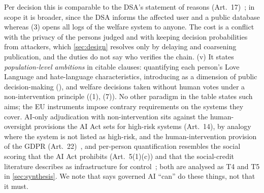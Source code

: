 Per decision this is comparable to the DSA's statement of reasons (Art.~17)~\cite{dsa2022}; in scope it is broader, since the DSA informs the affected user and a public database whereas (3) opens all logs of the welfare system to anyone.
The cost is a conflict with the privacy of the persons judged and with keeping decision probabilities from attackers, which \cref{sec:design} resolves only by delaying and coarsening publication, and the duties do not say who verifies the chain.
(v) It states \emph{population-level ambitions} in citable clauses: quantifying each person's Love Language and hate-language characteristics, introducing \pol{} as a dimension of public decision-making (), and welfare decisions taken without human votes under a non-intervention principle ((1), (7)).
No other paradigm in the table states such aims; the EU instruments impose contrary requirements on the systems they cover.
AI-only adjudication with non-intervention sits against the human-oversight provisions the AI Act sets for high-risk systems (Art.~14), by analogy where the system is not listed as high-risk, and the human-intervention provision of the GDPR (Art.~22)~\cite{euaiact2024,gdpr2016}, and per-person quantification resembles the social scoring that the AI Act prohibits (Art.~5(1)(c)) and that the social-credit literature describes as infrastructure for control~\cite{creemers2018social,liang2018constructing}; both are analysed as T4 and T5 in \cref{sec:synthesis}.
We note that  says governed AI ``can'' do these things, not that it must.

